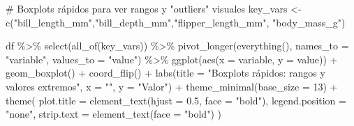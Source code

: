 \documentclass[
  spanish,
  11pt,
  a4paper,
  DIV=11,
  numbers=noendperiod]{scrartcl}
\newenvironment{Shaded}{\begin{snugshade}}{\end{snugshade}}
\newcommand{\AttributeTok}[1]{\textcolor[rgb]{0.40,0.45,0.13}{#1}}
\newcommand{\CommentTok}[1]{\textcolor[rgb]{0.37,0.37,0.37}{#1}}
\newcommand{\DecValTok}[1]{\textcolor[rgb]{0.68,0.00,0.00}{#1}}
\newcommand{\FloatTok}[1]{\textcolor[rgb]{0.68,0.00,0.00}{#1}}
\newcommand{\FunctionTok}[1]{\textcolor[rgb]{0.28,0.35,0.67}{#1}}
\newcommand{\NormalTok}[1]{\textcolor[rgb]{0.00,0.23,0.31}{#1}}
\newcommand{\OtherTok}[1]{\textcolor[rgb]{0.00,0.23,0.31}{#1}}
\newcommand{\SpecialCharTok}[1]{\textcolor[rgb]{0.37,0.37,0.37}{#1}}
\newcommand{\StringTok}[1]{\textcolor[rgb]{0.13,0.47,0.30}{#1}}
\begin{document}
\begin{Shaded}
\begin{Highlighting}[numbers=left,,]
\CommentTok{\# Boxplots rápidos para ver rangos y "outliers" visuales}
\NormalTok{key\_vars }\OtherTok{\textless{}{-}} \FunctionTok{c}\NormalTok{(}\StringTok{"bill\_length\_mm"}\NormalTok{,}\StringTok{"bill\_depth\_mm"}\NormalTok{,}\StringTok{"flipper\_length\_mm"}\NormalTok{,}
              \StringTok{"body\_mass\_g"}\NormalTok{)}

\NormalTok{df }\SpecialCharTok{\%\textgreater{}\%}
  \FunctionTok{select}\NormalTok{(}\FunctionTok{all\_of}\NormalTok{(key\_vars)) }\SpecialCharTok{\%\textgreater{}\%}
  \FunctionTok{pivot\_longer}\NormalTok{(}\FunctionTok{everything}\NormalTok{(), }\AttributeTok{names\_to =} \StringTok{"variable"}\NormalTok{, }\AttributeTok{values\_to =} \StringTok{"value"}\NormalTok{) }\SpecialCharTok{\%\textgreater{}\%}
  \FunctionTok{ggplot}\NormalTok{(}\FunctionTok{aes}\NormalTok{(}\AttributeTok{x =}\NormalTok{ variable, }\AttributeTok{y =}\NormalTok{ value)) }\SpecialCharTok{+}
  \FunctionTok{geom\_boxplot}\NormalTok{() }\SpecialCharTok{+}
  \FunctionTok{coord\_flip}\NormalTok{() }\SpecialCharTok{+}
  \FunctionTok{labs}\NormalTok{(}\AttributeTok{title =} \StringTok{"Boxplots rápidos: rangos y valores extremos"}\NormalTok{,}
       \AttributeTok{x =} \StringTok{""}\NormalTok{, }\AttributeTok{y =} \StringTok{"Valor"}\NormalTok{) }\SpecialCharTok{+}
  \FunctionTok{theme\_minimal}\NormalTok{(}\AttributeTok{base\_size =} \DecValTok{13}\NormalTok{) }\SpecialCharTok{+}
  \FunctionTok{theme}\NormalTok{(}
   \AttributeTok{plot.title =} \FunctionTok{element\_text}\NormalTok{(}\AttributeTok{hjust =} \FloatTok{0.5}\NormalTok{, }\AttributeTok{face =} \StringTok{"bold"}\NormalTok{),}
   \AttributeTok{legend.position =} \StringTok{"none"}\NormalTok{,}
   \AttributeTok{strip.text =} \FunctionTok{element\_text}\NormalTok{(}\AttributeTok{face =} \StringTok{"bold"}\NormalTok{)}
\NormalTok{   )}
\end{Highlighting}
\end{Shaded}
\end{document}
